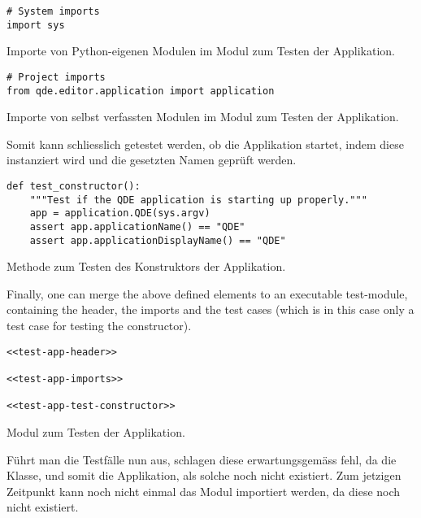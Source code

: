 \documentclass[10pt, openright, notitlepage]{scrreprt}
\begin{document}
\begin{listing}[H]
\begin{verbatim}
# System imports
import sys
\end{verbatim}
\caption{\label{orgc47d531}
Importe von Python-eigenen Modulen im Modul zum Testen der Applikation.}
\end{listing}

\begin{listing}[H]
\begin{verbatim}
# Project imports
from qde.editor.application import application
\end{verbatim}
\caption{\label{org3328d5d}
Importe von selbst verfassten Modulen im Modul zum Testen der Applikation.}
\end{listing}

Somit kann schliesslich getestet werden, ob die Applikation startet, indem diese
instanziert wird und die gesetzten Namen geprüft werden.

\begin{listing}[H]
\begin{verbatim}
def test_constructor():
    """Test if the QDE application is starting up properly."""
    app = application.QDE(sys.argv)
    assert app.applicationName() == "QDE"
    assert app.applicationDisplayName() == "QDE"
\end{verbatim}
\caption{\label{org9c90a6f}
Methode zum Testen des Konstruktors der Applikation.}
\end{listing}

Finally, one can merge the above defined elements to an executable test-module,
containing the header, the imports and the test cases (which is in this case
only a test case for testing the constructor).

\begin{listing}[H]
\begin{verbatim}
<<test-app-header>>

<<test-app-imports>>

<<test-app-test-constructor>>
\end{verbatim}
\caption{Modul zum Testen der Applikation.}
\end{listing}

Führt man die Testfälle nun aus, schlagen diese erwartungsgemäss fehl, da die
Klasse, und somit die Applikation, als solche noch nicht existiert. Zum jetzigen
Zeitpunkt kann noch nicht einmal das Modul importiert werden, da diese noch
nicht existiert.
\end{document}
